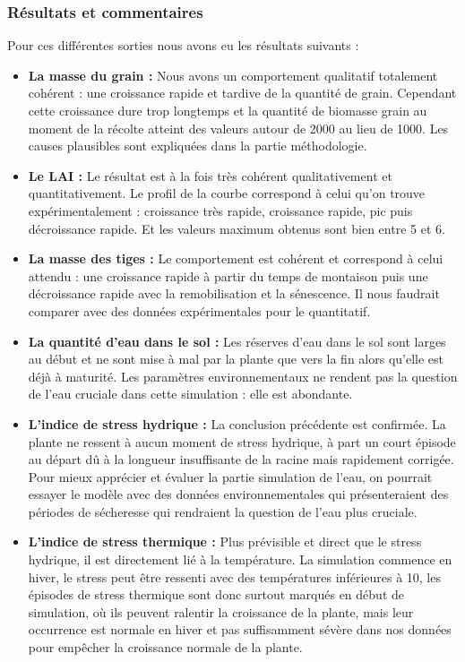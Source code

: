 \subsubsection{Résultats et commentaires}

Pour ces différentes sorties nous avons eu les résultats suivants :

\begin{itemize}
	\item \textbf{La masse du grain :} Nous avons un comportement qualitatif totalement cohérent : une croissance rapide et tardive de la quantité de grain. Cependant cette croissance dure trop longtemps et la quantité de biomasse grain au moment de la récolte atteint des valeurs autour de 2000 au lieu de 1000. Les causes plausibles sont expliquées dans la partie méthodologie.
	
	\item \textbf{Le LAI :} Le résultat est à la fois très cohérent qualitativement et quantitativement. Le profil de la courbe correspond à celui qu'on trouve expérimentalement : croissance très rapide, croissance rapide, pic puis décroissance rapide. Et les valeurs maximum obtenus sont bien entre 5 et 6.
	
	\item \textbf{La masse des tiges :} Le comportement est cohérent et correspond à celui attendu : une croissance rapide à partir du temps de montaison puis une décroissance rapide avec la remobilisation et la sénescence. Il nous faudrait comparer avec des données expérimentales pour le quantitatif.
	
	\item \textbf{La quantité d'eau dans le sol :} Les réserves d'eau dans le sol sont larges au début et ne sont mise à mal par la plante que vers la fin alors qu'elle est déjà à maturité. Les paramètres environnementaux ne rendent pas la question de l'eau cruciale dans cette simulation : elle est abondante.
	
	\item \textbf{L'indice de stress hydrique :} La conclusion précédente est confirmée. La plante ne ressent à aucun moment de stress hydrique, à part un court épisode au départ dû à la longueur insuffisante de la racine mais rapidement corrigée. Pour mieux apprécier et évaluer la partie simulation de l'eau, on pourrait essayer le modèle avec des données environnementales qui présenteraient des périodes de sécheresse qui rendraient la question de l'eau plus cruciale.
	
	\item \textbf{L'indice de stress thermique :} Plus prévisible et direct que le stress hydrique, il est directement lié à la température. La simulation commence en hiver, le stress peut être ressenti avec des températures inférieures à 10, les épisodes de stress thermique sont donc surtout marqués en début de simulation, où ils peuvent ralentir la croissance de la plante, mais leur occurrence est normale en hiver et pas suffisamment sévère dans nos données pour empêcher la croissance normale de la plante.
\end{itemize}

